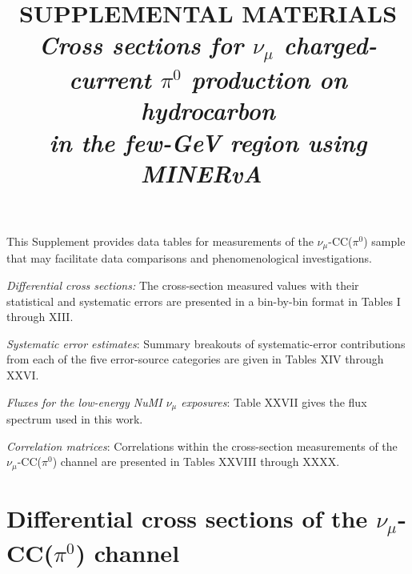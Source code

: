 \documentclass[aps, prd, reprint,showpacs,  preprintnumbers,amsmath,amssymb,superscriptaddress, nofootinbib]{revtex4-1}
\newcommand{\numu}{\mbox{$\nu_{\mu}$}}                   %
\newcommand{\minerva}{MINERvA~}
\begin{document}


\title{SUPPLEMENTAL MATERIALS\\ {\it Cross sections for $\numu$ charged-current $\pi^{0}$ production on hydrocarbon\\ 
in the few-GeV region using \minerva}}    

\smallskip
\vspace{10pt}   

\begin{abstract}
\end{abstract}


\maketitle

This Supplement provides data tables for measurements of the $\numu$-CC($\pi^{0}$) sample
that may facilitate data comparisons and phenomenological investigations.

\smallskip
\noindent
{\it Differential cross sections:}  The cross-section measured values with their statistical and systematic errors are 
presented in a bin-by-bin format in Tables I through XIII. 

\smallskip
\noindent
{\it Systematic error estimates}:  Summary breakouts of systematic-error contributions from each 
of the five error-source categories are given in Tables XIV through XXVI.

\smallskip
\noindent
{\it Fluxes for the low-energy NuMI $\numu$ exposures}:  Table XXVII gives the flux spectrum used in this work.

\smallskip
\noindent
{\it Correlation matrices}: Correlations within the cross-section measurements of the $\numu$-CC($\pi^{0}$) channel
are presented in Tables XXVIII through XXXX.

\section{Differential cross sections of the $\numu$-CC($\pi^{0}$) channel}
\end{document}
